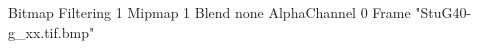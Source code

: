 {Bitmap
	{Filtering 1}
	{Mipmap 1}
	{Blend none}
	{AlphaChannel 0}
	{Frame "StuG40-g_xx.tif.bmp"}
}
